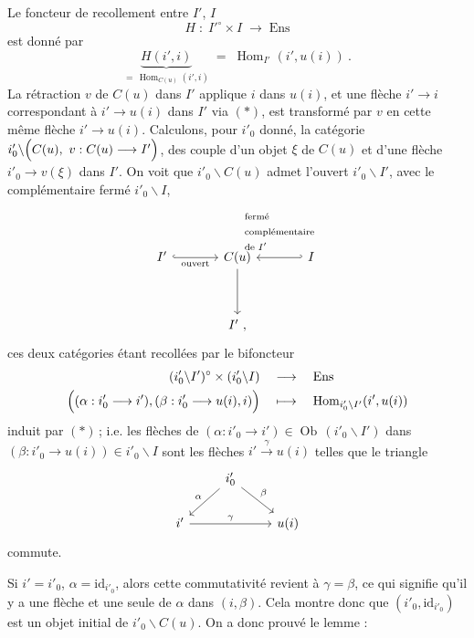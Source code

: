 \documentclass[11pt]{article}
\newcommand{\printedpage}[1]{\marginpar{\footnotesize p.~#1\ifstrequal{#1}{1}{\\[2pt]{[page 1]}}{}}}
\newcommand{\msp}[1]{\ifstrequal{#1}{page 1}{}{\marginpar{\footnotesize [#1]}}}
\newcommand{\Ob}{\operatorname{Ob}}
\newcommand{\Hom}{\operatorname{Hom}}
\newcommand{\id}{\mathrm{id}}
\begin{document}
\msp{page 61}
Le foncteur de recollement entre $I'$, $I$
\[
H \;:\; I'^\circ\times I \;\longrightarrow\; \mathrm{Ens}
\]
est donné par
\[
\underbrace{H(i',i)}_{=\,\Hom_{C(u)}(i',i)} \;=\; \Hom_{I'}(i',u(i))\ . \tag*{$(*)$}
\]
La rétraction $v$ de $C(u)$ dans $I'$ applique $i$ dans $u(i)$, et une flèche $i'\longrightarrow i$ correspondant à $i'\longrightarrow u(i)$ dans $I'$ via $(*)$, est transformé par $v$ en cette même flèche $i'\longrightarrow u(i)$. Calculons, %
pour $i'_0$ donné, la catégorie $i'_0\backslash\Bigl(C(u),\ v : C(u)\longrightarrow I'\Bigr)$, des couple d'un objet $\xi$ de $C(u)$ %
et d'une flèche $i'_0\longrightarrow v(\xi)$ dans $I'$. On voit que $i'_0\backslash C(u)$ admet l'ouvert $i'_0\backslash I'$, avec le complémentaire fermé $i'_0\backslash I$,
\[
\begin{tikzcd}[column sep=large, row sep=huge]
I' \arrow[r, hook, "\text{ouvert}"'] & C(u) \arrow[d] & I \arrow[l, hook', "\begin{array}{l}\text{fermé}\\ \text{complémentaire}\\ \text{de } I'\end{array}"'] \\
 & I'\ ,
\end{tikzcd}
\]
ces deux catégories étant recollées par le bifoncteur
\[
\begin{aligned}
(i'_0\backslash I')^\circ \times (i'_0\backslash I) &\quad\longrightarrow\quad \mathrm{Ens}\\
\Bigl((\alpha : i'_0\longrightarrow i'), (\beta : i'_0\longrightarrow u(i), i)\Bigr) &\quad\longmapsto\quad \Hom_{i'_0\backslash I'}(i',u(i))
\end{aligned}
\]
\printedpage{31}
induit par $(*)$\,; i.e. les flèches de $(\alpha : i'_0\longrightarrow i') \in \Ob\,(i'_0\backslash I')$ dans $(\beta : i'_0\longrightarrow u(i)) \in i'_0\backslash I$ sont les flèches $i' \xrightarrow{\gamma} u(i)$ telles que le triangle
\[
\begin{tikzcd}
 & i'_0 \arrow[dl, "\alpha"'] \arrow[dr, "\beta"] & \\
i' \arrow[rr, "\gamma"] & & u(i)
\end{tikzcd}
\]
commute.

\msp{page 62}
Si $i' = i'_0$, $\alpha = \id_{i'_0}$, alors cette commutativité revient à $\gamma = \beta$, ce qui signifie qu'il y a une flèche et une seule de $\alpha$ dans $(i,\beta)$. Cela montre donc que $(i'_0,\id_{i'_0})$ est un objet initial de $i'_0\backslash C(u)$. On a donc prouvé le lemme :
\end{document}
